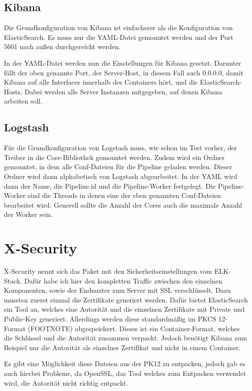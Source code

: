 \subsection{Kibana}

Die Grundkonfiguration von Kibana ist einfacherer als die Konfiguration von ElasticSearch. Es muss nur die YAML-Datei gemountet werden und der Port 5601 nach außen durchgereicht werden.

In der YAML-Datei werden nun die Einstellungen für Kibana gesetzt. Darunter fällt der oben genannte Port, der Server-Host, in diesem Fall auch 0.0.0.0, damit Kibana auf alle Interfaces innerhalb des Containers hört, und die ElasticSearch-Hosts. Dabei werden alle Server Instanzen mitgegeben, auf denen Kibana arbeiten soll. 

\subsection{Logstash}

Für die Grundkonfiguration von Logstash muss, wie schon im Test vorher, der Treiber in die Core-Bibliothek gemountet werden. Zudem wird ein Ordner gemountet, in dem alle Conf-Dateien für die Pipeline geladen werden. Dieser Ordner wird dann alphabetisch von Logstash abgearbeitet. In der YAML wird dann der Name, die Pipeline.id und die Pipeline-Worker festgelegt. Die Pipeline-Worker sind die Threads in denen eine der eben genannten Conf-Dateien bearbeitet wird. Generell sollte die Anzahl der Cores auch die maximale Anzahl der Worker sein.


\section{X-Security}

X-Security nennt sich das Paket mit den Sicherheitseinstellungen vom ELK-Stack. Dafür habe ich hier den kompletten Traffic zwischen den einzelnen Komponenten, sowie der Endnuzter zum Server mit SSL verschlüsselt. Dazu mussten zuerst einmal die Zertifikate generiert werden. Dafür bietet ElasticSearch ein Tool an, welches eine Autorität und die einzelnen Zertifikate mit Private und Public-Key generiert. Allerdings werden diese standardmäßig im PKCS 12-Format (FOOTNOTE) abgespeichert. Dieses ist ein Container-Format, welches die Schlüssel und die Autorität zusammen verpackt. Jedoch benötigt Kibana zum Beispiel nur die Autorität als einzelnes Zertifikat und nicht in einem Container.

Es gibt eine Möglichkeit diese Dateien aus der PK12 zu entpacken, jedoch gab es auch hierbei Probleme, da OpenSSL, das Tool welches zum Entpacken verwendet wird, die Autorität nicht richtig entpackt. \cite{nerophon.2018}

